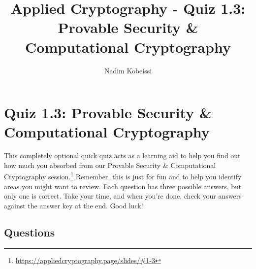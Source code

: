 \documentclass[10pt,a4paper,american]{exam}
\title{Applied Cryptography - Quiz 1.3: Provable Security \& Computational Cryptography}
\author{Nadim Kobeissi}
\begin{document}
\classhandoutheader
\section*{Quiz 1.3: Provable Security \& Computational Cryptography}

\begin{tcolorbox}[colframe=OliveGreen!30!white,colback=OliveGreen!5!white]
	This completely optional quick quiz acts as a learning aid to help you find out how much you absorbed from our Provable Security \& Computational Cryptography session.\footnote{\url{https://appliedcryptography.page/slides/\#1-3}} Remember, this is just for fun and to help you identify areas you might want to review. Each question has three possible answers, but only one is correct. Take your time, and when you're done, check your answers against the answer key at the end. Good luck!
\end{tcolorbox}

\subsection*{Questions}
\end{document}
